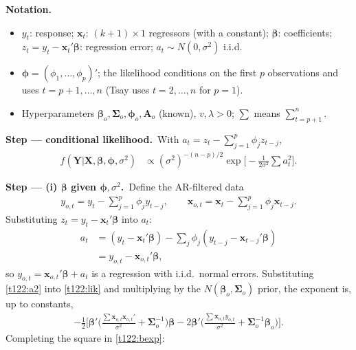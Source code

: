 \documentclass[11pt,a4paper]{article}
\newenvironment{notacao}{\par\smallskip\noindent\textbf{Notation.}\begin{itemize}[leftmargin=1.4em,topsep=1pt,itemsep=0pt]\small}{\end{itemize}}
\newcommand{\passo}[2]{\par\smallskip\noindent\textbf{Step --- #1.}~#2}
\begin{document}
\begin{sol}
\begin{notacao}
\item $y_t$: response; $\boldsymbol x_t$: $(k+1)\times1$ regressors (with a constant); $\boldsymbol\beta$: coefficients; $z_t=y_t-\boldsymbol x_t'\boldsymbol\beta$: regression error; $a_t\sim N(0,\sigma^2)$ i.i.d.
\item $\boldsymbol\phi=(\phi_1,\ldots,\phi_p)'$; the likelihood conditions on the first $p$ observations and uses $t=p+1,\ldots,n$ (Tsay uses $t=2,\ldots,n$ for $p=1$).
\item Hyperparameters $\boldsymbol\beta_o,\boldsymbol\Sigma_o,\boldsymbol\phi_o,\boldsymbol A_o$ (known), $v,\lambda>0$; $\sum$ means $\sum_{t=p+1}^n$.
\end{notacao}
\passo{conditional likelihood}{With $a_t=z_t-\sum_{j=1}^p\phi_jz_{t-j}$,
\begin{align}
f(\boldsymbol Y|\boldsymbol X,\boldsymbol\beta,\boldsymbol\phi,\sigma^2)&\propto(\sigma^2)^{-(n-p)/2}\exp\Big[-\frac{1}{2\sigma^2}\textstyle\sum a_t^2\Big].\label{t122:lik}
\end{align}}
\passo{(i) $\boldsymbol\beta$ given $\boldsymbol\phi,\sigma^2$}{Define the AR-filtered data
\begin{align}
y_{o,t}=y_t-\textstyle\sum_{j=1}^p\phi_jy_{t-j},\qquad\boldsymbol x_{o,t}=\boldsymbol x_t-\textstyle\sum_{j=1}^p\phi_j\boldsymbol x_{t-j}.\label{t122:filt}
\end{align}
Substituting $z_t=y_t-\boldsymbol x_t'\boldsymbol\beta$ into $a_t$:
\begin{align}
a_t&=(y_t-\boldsymbol x_t'\boldsymbol\beta)-\textstyle\sum_j\phi_j(y_{t-j}-\boldsymbol x_{t-j}'\boldsymbol\beta)\label{t122:a1}\\
&=y_{o,t}-\boldsymbol x_{o,t}'\boldsymbol\beta,\label{t122:a2}
\end{align}
so $y_{o,t}=\boldsymbol x_{o,t}'\boldsymbol\beta+a_t$ is a regression with i.i.d.\ normal errors. Substituting \eqref{t122:a2} into \eqref{t122:lik} and multiplying by the $N(\boldsymbol\beta_o,\boldsymbol\Sigma_o)$ prior, the exponent is, up to constants,
\begin{align}
-\tfrac12\Big[\boldsymbol\beta'\Big(\frac{\sum\boldsymbol x_{o,t}\boldsymbol x_{o,t}'}{\sigma^2}+\boldsymbol\Sigma_o^{-1}\Big)\boldsymbol\beta-2\boldsymbol\beta'\Big(\frac{\sum\boldsymbol x_{o,t}y_{o,t}}{\sigma^2}+\boldsymbol\Sigma_o^{-1}\boldsymbol\beta_o\Big)\Big].\label{t122:bexp}
\end{align}
Completing the square in \eqref{t122:bexp}:
}
\end{sol}
\end{document}
